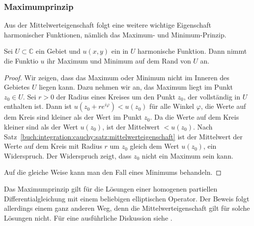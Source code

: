 %
%
\subsubsection{Maximumprinzip}
Aus der Mittelwerteigenschaft folgt eine weitere wichtige Eigenschaft
harmonischer Funktionen, nämlich das Maximum- und Minimum-Prinzip.

\begin{satz}[Maximumprinzip]
%
Sei $U\subset\mathbb{C}$ ein Gebiet und $u(x,y)$ ein in $U$ harmonische
Funktion.
Dann nimmt die Funktio $u$ ihr Maximum und Minimum auf dem Rand von $U$ an.
\end{satz}

\begin{proof}
Wir zeigen, dass das Maximum oder Minimum nicht im Inneren des Gebietes
$U$ liegen kann.
Dazu nehmen wir an, das Maximum liegt im Punkt $z_0\in U$.
Sei $r>0$ der Radius eines Kreises um den Punkt $z_0$, der vollständig
in $U$ enthalten ist.
Dann ist $u(z_0+ re^{i\varphi}) < u(z_0)$ für alle Winkel $\varphi$,
die Werte auf dem Kreis sind kleiner als der Wert im Punkt $z_0$.
Da die Werte auf dem Kreis kleiner sind als der Wert $u(z_0)$,
ist der Mittelwert $<u(z_0)$.
Nach Satz~\ref{buch:integration:cauchy:satz:mittelwerteigenschaft} ist
der Mittelwert der Werte auf dem Kreis mit Radius $r$ um $z_0$ gleich dem
Wert $u(z_0)$, ein Widerspruch.
Der Widerspruch zeigt, dass $z_0$ nicht ein Maximum sein kann.

Auf die gleiche Weise kann man den Fall eines Minimums behandeln.
\end{proof}

Das Maximumprinzip gilt für die Lösungen einer homogenen partiellen
Differentialgleichung mit einem beliebigen elliptischen Operator.
Der Beweis folgt allerdings einem ganz anderen Weg, denn die
Mittelwerteigenschaft gilt für solche Lösungen nicht.
Für eine ausführliche Diskussion siehe \cite[section 6.4]{buch:evans}.
